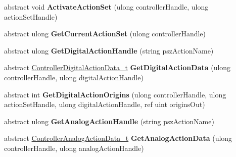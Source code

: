 \begin{DoxyCompactItemize}
abstract void {\bfseries Activate\+Action\+Set} (ulong controller\+Handle, ulong action\+Set\+Handle)
\item 
\mbox{\label{class_valve_1_1_steamworks_1_1_i_steam_controller_ab98138768daa19517b97621675a171d1}} 
abstract ulong {\bfseries Get\+Current\+Action\+Set} (ulong controller\+Handle)
\item 
\mbox{\label{class_valve_1_1_steamworks_1_1_i_steam_controller_ac185580630bf2cbb335c0556ccb3f271}} 
abstract ulong {\bfseries Get\+Digital\+Action\+Handle} (string psz\+Action\+Name)
\item 
\mbox{\label{class_valve_1_1_steamworks_1_1_i_steam_controller_a62e79ac1b4ceb7988e19eaf9cfb800c1}} 
abstract \hyperlink{struct_valve_1_1_steamworks_1_1_controller_digital_action_data__t}{Controller\+Digital\+Action\+Data\+\_\+t} {\bfseries Get\+Digital\+Action\+Data} (ulong controller\+Handle, ulong digital\+Action\+Handle)
\item 
\mbox{\label{class_valve_1_1_steamworks_1_1_i_steam_controller_ac5e207258619f4addd9afa715661600c}} 
abstract int {\bfseries Get\+Digital\+Action\+Origins} (ulong controller\+Handle, ulong action\+Set\+Handle, ulong digital\+Action\+Handle, ref uint origins\+Out)
\item 
\mbox{\label{class_valve_1_1_steamworks_1_1_i_steam_controller_a83af467131b89cfeb94ac8c8884e67b8}} 
abstract ulong {\bfseries Get\+Analog\+Action\+Handle} (string psz\+Action\+Name)
\item 
\mbox{\label{class_valve_1_1_steamworks_1_1_i_steam_controller_aff8922184097ae0213767e26c8a2d087}} 
abstract \hyperlink{struct_valve_1_1_steamworks_1_1_controller_analog_action_data__t}{Controller\+Analog\+Action\+Data\+\_\+t} {\bfseries Get\+Analog\+Action\+Data} (ulong controller\+Handle, ulong analog\+Action\+Handle)
\item 
\mbox{\label{class_valve_1_1_steamworks_1_1_i_steam_controller_a523734354e7f0f1e2b14c6660c7f804d}} 

\end{DoxyCompactItemize}
